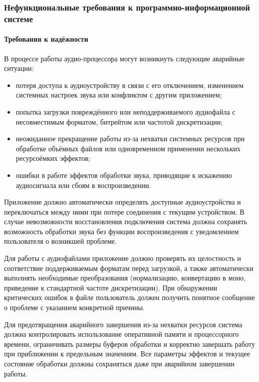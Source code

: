 \subsubsection{Нефункциональные требования к программно-информационной системе}

\paragraph{Требования к надёжности}

В процессе работы аудио-процессора могут возникнуть следующие аварийные ситуации:
\begin{itemize}
	\item потеря доступа к аудиоустройству в связи с его отключением, изменением системных настроек звука или конфликтом с другим приложением;
	\item попытка загрузки повреждённого или неподдерживаемого аудиофайла с несовместимым форматом, битрейтом или частотой дискретизации;
	\item неожиданное прекращение работы из-за нехватки системных ресурсов при обработке объёмных файлов или одновременном применении нескольких ресурсоёмких эффектов;
	\item ошибки в работе эффектов обработки звука, приводящие к искажению аудиосигнала или сбоям в воспроизведении.
\end{itemize}

Приложение должно автоматически определять доступные аудиоустройства и переключаться между ними при потере соединения с текущим устройством. В случае невозможности восстановления подключения система должна сохранять возможность обработки звука без функции воспроизведения с уведомлением пользователя о возникшей проблеме.

Для работы с аудиофайлами приложение должно проверять их целостность и соответствие поддерживаемым форматам перед загрузкой, а также автоматически выполнять необходимые преобразования (нормализацию, конвертацию в моно, приведение к стандартной частоте дискретизации). При обнаружении критических ошибок в файле пользователь должен получить понятное сообщение о проблеме с указанием конкретной причины.

Для предотвращения аварийного завершения из-за нехватки ресурсов система должна контролировать использование оперативной памяти и процессорного времени, ограничивать размеры буферов обработки и корректно завершать работу при приближении к предельным значениям. Все параметры эффектов и текущее состояние обработки должны сохраняться даже при аварийном завершении работы.

